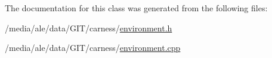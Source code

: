 The documentation for this class was generated from the following files\-:\begin{DoxyCompactItemize}
\item 
/media/ale/data/\-G\-I\-T/carness/\hyperlink{a00022}{environment.\-h}\item 
/media/ale/data/\-G\-I\-T/carness/\hyperlink{a00021}{environment.\-cpp}\end{DoxyCompactItemize}
